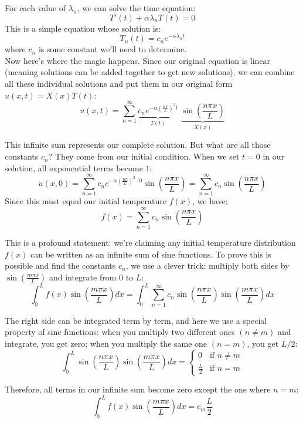 \noindent For each value of $\lambda_n$, we can solve the time equation:
\[
T'(t) + \alpha\lambda_n T(t) = 0
\]
This is a simple equation whose solution is:
\[
T_n(t) = c_n e^{-\alpha\lambda_n t}
\]
where $c_n$ is some constant we'll need to determine. \\

\noindent Now here's where the magic happens. Since our original equation is linear (meaning solutions can be added together to get new solutions), we can combine all these individual solutions and put them in our original form $u(x,t) = X(x)T(t)$:
\[
u(x,t) = \sum_{n=1}^{\infty} \underbrace{c_n e^{-\alpha(\frac{n\pi}{L})^2 t}}_{T(t)} \; \underbrace{\sin\left(\frac{n\pi x}{L}\right)}_{X(x)}
\]

\noindent This infinite sum represents our complete solution. But what are all those constants $c_n$? They come from our initial condition. When we set $t=0$ in our solution, all exponential terms become $1$:
\[
u(x,0) = \sum_{n=1}^{\infty} c_n e^{-\alpha(\frac{n\pi}{L})^2 \cdot 0}\sin\left(\frac{n\pi x}{L}\right) = \sum_{n=1}^{\infty} c_n\sin\left(\frac{n\pi x}{L}\right)
\]
Since this must equal our initial temperature $f(x)$, we have:
\[
f(x) = \sum_{n=1}^{\infty} c_n\sin\left(\frac{n\pi x}{L}\right)
\]

\noindent This is a profound statement: we're claiming any initial temperature distribution $f(x)$ can be written as an infinite sum of sine functions. To prove this is possible and find the constants $c_n$, we use a clever trick: multiply both sides by $\sin(\frac{m\pi x}{L})$ and integrate from $0$ to $L$:
\[
\int_0^L f(x)\sin\left(\frac{m\pi x}{L}\right)dx = \int_0^L \sum_{n=1}^{\infty} c_n\sin\left(\frac{n\pi x}{L}\right)\sin\left(\frac{m\pi x}{L}\right)dx
\]

\noindent The right side can be integrated term by term, and here we use a special property of sine functions: when you multiply two different ones $(n \neq m)$ and integrate, you get zero; when you multiply the same one $(n = m)$, you get $L/2$:
\[
\int_0^L \sin\left(\frac{n\pi x}{L}\right)\sin\left(\frac{m\pi x}{L}\right)dx = \begin{cases}
0 & \text{if } n \neq m \\
\frac{L}{2} & \text{if } n = m
\end{cases}
\]

\noindent Therefore, all terms in our infinite sum become zero except the one where $n = m$:
\[
\int_0^L f(x)\sin\left(\frac{m\pi x}{L}\right)dx = c_m\frac{L}{2}
\]

